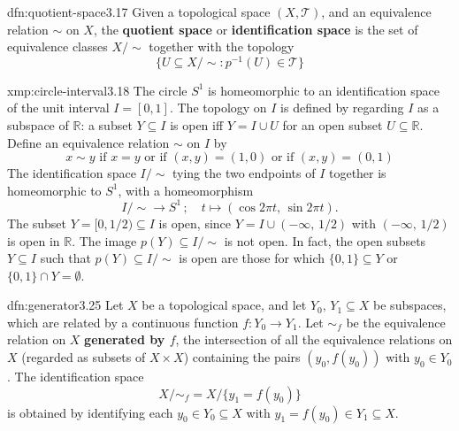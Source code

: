 \documentclass[landscape, 8pt]{extarticle}
\begin{document}
\begin{multicols}{3}
\begin{dfn}{dfn:quotient-space}{3.17}
	Given a topological space $(X, \mathcal{T})$, and an equivalence relation $\sim$ on $X$, the \textbf{quotient space} or \textbf{identification space} is the set of equivalence classes $X / \sim$ together with the topology
	\[\{ U \subseteq X / \sim : p^{-1} (U) \in \mathcal{T}\}\]
\end{dfn}

\begin{xmp}{xmp:circle-interval}{3.18}
	The circle $S^{1}$ is homeomorphic to an identification space of the unit interval $I = [0,1]$. The topology on $I$ is defined by regarding $I$ as a subspace of $\mathbb{R}$: a subset $Y \subseteq I$ is open iff $Y = I \cup U$ for an open subset $U \subseteq \mathbb{R}$. Define an equivalence relation $\sim$ on $I$ by
	\[x \sim y \text{ if } x = y \text{ or if } (x, y) = (1,0) \text{ or if } (x,y) = (0,1)\]
	The identification space $I / \sim$ tying the two endpoints of $I$ together is homeomorphic to $S^{1}$, with a homeomorphism
	\[I / \sim \to S^{1}\,; \quad t \mapsto (\cos 2\pi t,\, \sin 2\pi t).\]
	The subset $Y = [0,1 /2) \subseteq I$ is open, since $Y = I \cup (-\infty,\,1 /2)$ with $(-\infty,\,1 /2)$ is open in $\mathbb{R}$. The image $p(Y) \subseteq I /\sim$ is not open. In fact, the open subsets $Y \subseteq I$ such that $p(Y) \subseteq I /\sim$ is open are those for which $\{0,1\} \subseteq Y$ or $\{0,1\} \cap Y = \emptyset$.
\end{xmp}

\begin{dfn}{dfn:generator}{3.25}
	Let $X$ be a topological space, and let $Y_{0},\,Y_{1} \subseteq X$ be subspaces, which are related by a continuous function $f: Y_{0} \to Y_{1} $. Let $\sim_{f}$ be the equivalence relation on $X$ \textbf{generated by $f$}, the intersection of all the equivalence relations on $X$ (regarded as subsets of $X \times X $) containing the pairs $(y_{0}, f(y_{0}))$ with $y_{0}\in Y_{0}$. The identification space
	\[X /\sim_{f} = X / \{ y_{1} = f(y_{0})\}\]
	is obtained by identifying each $y_{0}\in Y_{0} \subseteq X$ with $y_{1} = f(y_{0}) \in Y_{1} \subseteq X$.
\end{dfn}



\end{multicols}
\end{document}
